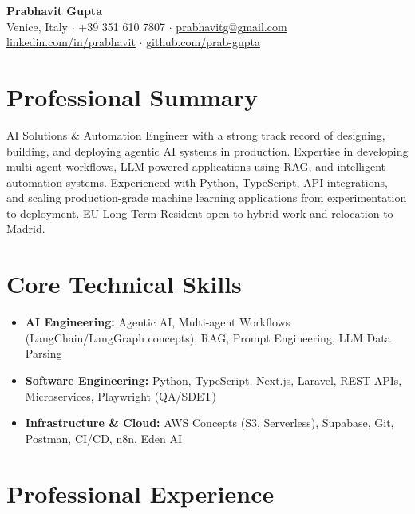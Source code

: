 \documentclass[10pt,a4paper]{article}
\begin{document}
\pagestyle{empty}

\begin{center}
    {\huge \textbf{Prabhavit Gupta}} \\
    \vspace{0.2cm}
    Venice, Italy $\cdot$ +39 351 610 7807 $\cdot$ \href{mailto:prabhavitg@gmail.com}{prabhavitg@gmail.com} \\
    \href{https://www.linkedin.com/in/prabhavit/}{linkedin.com/in/prabhavit} $\cdot$ \href{https://github.com/prab-gupta}{github.com/prab-gupta}
\end{center}

\vspace{0.2cm}

\section*{Professional Summary}
AI Solutions \& Automation Engineer with a strong track record of designing, building, and deploying agentic AI systems in production. Expertise in developing multi-agent workflows, LLM-powered applications using RAG, and intelligent automation systems. Experienced with Python, TypeScript, API integrations, and scaling production-grade machine learning applications from experimentation to deployment. EU Long Term Resident open to hybrid work and relocation to Madrid.

\section*{Core Technical Skills}
\begin{itemize}[leftmargin=0.15in, label={}]
    \item \textbf{AI Engineering:} Agentic AI, Multi-agent Workflows (LangChain/LangGraph concepts), RAG, Prompt Engineering, LLM Data Parsing
    \item \textbf{Software Engineering:} Python, TypeScript, Next.js, Laravel, REST APIs, Microservices, Playwright (QA/SDET)
    \item \textbf{Infrastructure \& Cloud:} AWS Concepts (S3, Serverless), Supabase, Git, Postman, CI/CD, n8n, Eden AI
\end{itemize}

\section*{Professional Experience}
\end{document}
